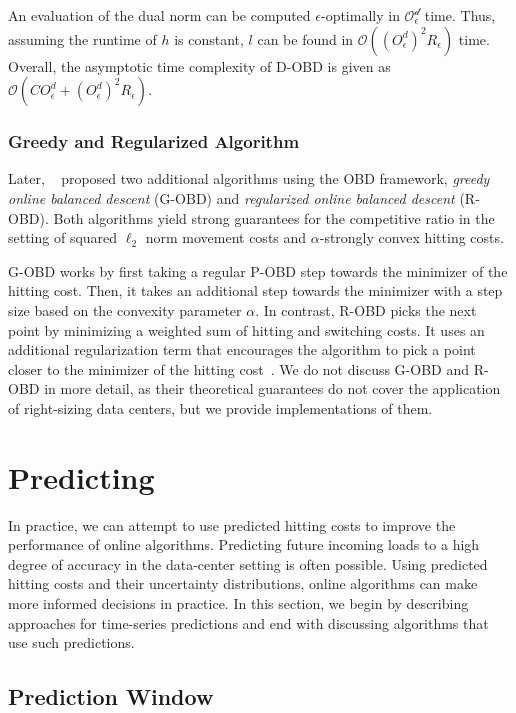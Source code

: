 An evaluation of the dual norm can be computed $\epsilon$-optimally in $\mathcal{O_{\epsilon}^d}$ time. Thus, assuming the runtime of $h$ is constant, $l$ can be found in $\mathcal{O}((O_{\epsilon}^d)^2 R_{\epsilon})$ time. Overall, the asymptotic time complexity of D-OBD is given as $\mathcal{O}(C O_{\epsilon}^d + (O_{\epsilon}^d)^2 R_{\epsilon})$.

\subsubsection{Greedy and Regularized Algorithm}

Later, \citeauthor*{Goel2019}~\cite{Goel2019} proposed two additional algorithms using the OBD framework, \emph{greedy online balanced descent} (G-OBD) and \emph{regularized online balanced descent} (R-OBD). Both algorithms yield strong guarantees for the competitive ratio in the setting of squared $\ell_2$ norm movement costs and $\alpha$-strongly convex hitting costs.

G-OBD works by first taking a regular P-OBD step towards the minimizer of the hitting cost. Then, it takes an additional step towards the minimizer with a step size based on the convexity parameter $\alpha$. In contrast, R-OBD picks the next point by minimizing a weighted sum of hitting and switching costs. It uses an additional regularization term that encourages the algorithm to pick a point closer to the minimizer of the hitting cost~\cite{Goel2019}. We do not discuss G-OBD and R-OBD in more detail, as their theoretical guarantees do not cover the application of right-sizing data centers, but we provide implementations of them.

\section{Predicting}\label{section:online_algorithms:md:predictions}

In practice, we can attempt to use predicted hitting costs to improve the performance of online algorithms. Predicting future incoming loads to a high degree of accuracy in the data-center setting is often possible. Using predicted hitting costs and their uncertainty distributions, online algorithms can make more informed decisions in practice. In this section, we begin by describing approaches for time-series predictions and end with discussing algorithms that use such predictions.

\subsection{Prediction Window}

